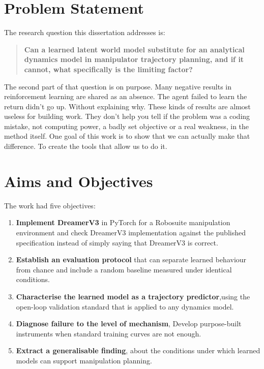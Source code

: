 \documentclass[12pt,a4paper,oneside]{report}
\providecommand{\tightlist}{%
  \setlength{\itemsep}{0pt}\setlength{\parskip}{0pt}}
\begin{document}
\hypertarget{problem-statement}{%
\section{Problem Statement}\label{problem-statement}}

The research question this dissertation addresses is:

\begin{quote}
\textbf{Can a learned latent world model substitute for an analytical dynamics
model in manipulator trajectory planning, and if it cannot, what specifically
is the limiting factor?}
\end{quote}

The second part of that question is on purpose. Many negative results in reinforcement learning are shared as an absence. The agent failed to learn the return didn’t go up. Without explaining why. These kinds of results are almost useless for building work. They don’t help you tell if the problem was a coding mistake, not computing power, a badly set objective or a real weakness, in the method itself. One goal of this work is to show that we can actually make that difference. To create the tools that allow us to do it.

\hypertarget{aims-and-objectives}{%
\section{Aims and Objectives}\label{aims-and-objectives}}

The work had five objectives:

\begin{enumerate}
\def\labelenumi{\arabic{enumi}.}
\tightlist
\item
  \textbf{Implement DreamerV3} in PyTorch for a Robosuite manipulation environment and check DreamerV3 implementation against the published specification instead of simply saying that DreamerV3 is correct.


\item
  \textbf{Establish an evaluation protocol} that can separate learned behaviour from chance and include a random baseline measured under identical conditions.
\item
  \textbf{Characterise the learned model as a trajectory predictor},using the open-loop validation standard that is applied to any dynamics model.
\item
  \textbf{Diagnose failure to the level of mechanism}, Develop purpose-built instruments when standard training curves are not enough.
\item
  \textbf{Extract a generalisable finding}, about the conditions under which learned models can support manipulation planning.
\end{enumerate}
\end{document}
